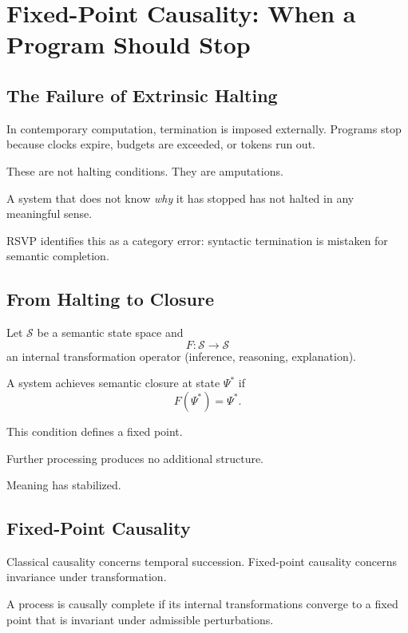 \documentclass[11pt]{book}
\begin{document}
\chapter{Fixed-Point Causality: When a Program Should Stop}

\section{The Failure of Extrinsic Halting}

In contemporary computation, termination is imposed externally.
Programs stop because clocks expire, budgets are exceeded, or tokens run out.

These are not halting conditions.
They are amputations.

A system that does not know \emph{why} it has stopped has not halted in any
meaningful sense.

RSVP identifies this as a category error: syntactic termination is mistaken for
semantic completion.

\section{From Halting to Closure}

Let \(\mathcal{S}\) be a semantic state space and
\[
F : \mathcal{S} \rightarrow \mathcal{S}
\]
an internal transformation operator (inference, reasoning, explanation).

\begin{definition}
A system achieves semantic closure at state \(\Psi^\ast\) if
\[
F(\Psi^\ast) = \Psi^\ast.
\]
\end{definition}

This condition defines a fixed point.

Further processing produces no additional structure.

Meaning has stabilized.

\section{Fixed-Point Causality}

Classical causality concerns temporal succession.
Fixed-point causality concerns invariance under transformation.

\begin{definition}
A process is causally complete if its internal transformations converge to a
fixed point that is invariant under admissible perturbations.
\end{definition}
\end{document}
